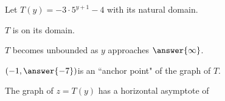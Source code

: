 \documentclass{ximera}
\author{Lee Wayand}
\begin{document}
\begin{exercise}




Let $T(y) = -3 \cdot 5^{y+1} - 4$ with its natural domain.


\begin{question}


$T$ is  on its domain. \\


\end{question}







\begin{question}


$T$ becomes unbounded as $y$ approaches $\answer{\infty}$.


\end{question}





\begin{question}


$\left( -1, \answer{-7} \right) $is an ``anchor point" of the graph of $T$. \\


\end{question}








\begin{question}


The graph of $z=T(y)$ has a horizontal asymptote of

\begin{multipleChoice}
\end{multipleChoice}


\end{question}








\end{exercise}
\end{document}
